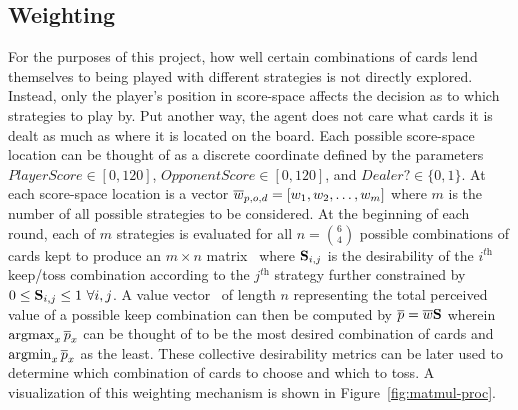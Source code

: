 

\subsection{Weighting}
\label{sec:dm-methods-weighting}



For the purposes of this project,
how well certain combinations of cards lend themselves to being played with 
different strategies is not directly explored.
%
Instead, only the player's position in score-space affects the decision as to
which strategies to play by.
%
Put another way, the agent does not care what cards it is dealt as much as where
it is located on the board.
%
Each possible score-space location can be thought of as a discrete coordinate
defined by the parameters
$\textit{PlayerScore} \in [0, 120]$,
$\textit{OpponentScore} \in [0, 120]$,
and
$\textit{Dealer?} \in \{0,1\}$.
%
At each score-space location is a vector $\overline{w}_{p,o,d} = [w_1,w_2,\ldots,w_m]$
where $m$ is the number of all possible strategies to be considered.
%
At the beginning of each round, each of $m$ strategies is evaluated for all
$n = {6 \choose 4}$ possible combinations of cards kept to produce an
$m \times n$ matrix \Smat\
where $\mathbf{S}_{i,j}$ is the desirability of the $i^{\textit{th}}$ keep/toss
combination according to the $j^{\textit{th}}$ strategy
further constrained by
$0 \le \mathbf{S}_{i,j} \le 1\ \forall i,j$.
%
A value vector \pvec\ of length $n$ representing the total perceived value of a
possible keep combination
can then be computed by
$\overline{p} = \overline{w} \mathbf{S}$
wherein $\operatorname*{argmax}_{x}{\overline{p}_x}$ can be thought of to be the most desired combination
of cards and $\operatorname*{argmin}_{x}{\overline{p}_x}$ as the least.
%
These collective desirability metrics can be later used to determine which
combination of cards to choose and which to toss.
%
A visualization of this weighting mechanism is shown in
Figure~\ref{fig:matmul-proc}.





